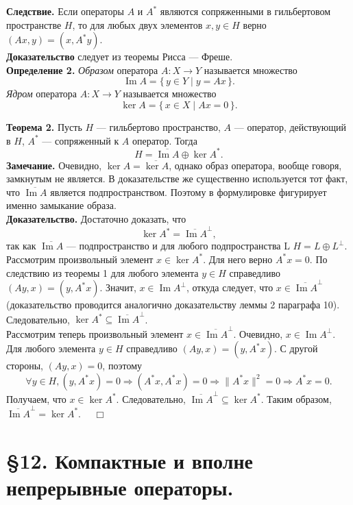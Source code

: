 \documentclass[12pt,a4paper, titlepage]{article}
\renewcommand{\Im}{\mathop{\mathrm{Im}}\nolimits}
\begin{document}
\textbf{Следствие.} Если операторы $A$ и $A^*$ являются сопряженными в гильбертовом пространстве $H$, то для любых двух элементов $x, y \in H$ верно $(Ax, y) = (x, A^*y).$\\
\textbf{Доказательство} следует из теоремы Рисса --- Фреше.\\

\textbf{Определение 2.} \textit{Образом} оператора $A: X \to Y$ называется множество
$$
\Im A = \{\,y \in Y \mid y = Ax\,\}.
$$
\textit{Ядром} оператора $A: X \to Y$ называется множество
$$
\ker A = \{\,x \in X \mid Ax = 0\,\}.
$$

\textbf{Теорема 2.} Пусть $H$ --- гильбертово пространство, $A$ --- оператор, действующий в $H$, $A^*$ --- сопряженный к $A$ оператор. Тогда
$$
H = \overline{\Im A} \oplus \ker A^*.
$$
\textbf{Замечание.} Очевидно, $\ker A = \overline{\ker A}$, однако образ оператора, вообще говоря, замкнутым не является. В доказательстве же существенно используется тот факт, что $\overline{\Im A}$ является подпространством. Поэтому в формулировке фигурирует именно замыкание образа.\\
\textbf{Доказательство.} Достаточно доказать, что
$$
\ker A^* = \overline{\Im A}^\perp,
$$
так как $\overline{\Im A}$ --- подпространство и для любого подпространства L $H = L \oplus L^\perp$.\\

Рассмотрим произвольный элемент $x \in \ker A^*$. Для него верно $A^*x = 0$. По следствию из теоремы 1 для любого элемента $y \in H$ справедливо $(Ay, x) = (y, A^*x)$. Значит, $x \in {\Im A}^\perp$, откуда следует, что $x\in \overline{\Im A}^\perp$ (доказательство проводится аналогично доказательству леммы 2 параграфа 10). Следовательно, $\ker A^* \subseteq \overline{\Im A}^\perp$.\\

Рассмотрим теперь произвольный элемент $x \in \overline{\Im A}^\perp$. Очевидно, $x \in {\Im A}^\perp$. Для любого элемента $y \in H$ справедливо $(Ay, x) = (y, A^*x)$. С другой стороны, $(Ay, x) = 0$, поэтому
$$
\forall y \in H, (y, A^*x) = 0 \Rightarrow (A^*x, A^*x) = 0 \Rightarrow \|A^*x\|^2 = 0 
\Rightarrow A^*x = 0.
$$
Получаем, что $x \in \ker A^*$. Следовательно, $\overline{\Im A}^\perp \subseteq \ker A^*$. Таким образом, $\overline{\Im A}^\perp = \ker A^*$. $\quad \Box$\\



\section*{ \S 12. Компактные и вполне непрерывные операторы.}
\end{document}
